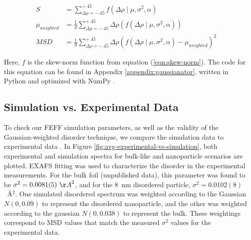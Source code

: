 
\begin{align}
	\label{eqn:updated-weighted-MSD}
	S &= \sum_{\Delta\rho=-.45}^{+.45} f\left(\Delta \rho \mid \mu, \sigma^2, \alpha \right) \\
	\mu_{weighted} &= \frac{1}{S} \sum_{\Delta\rho=-.45}^{+.45} \Delta\rho \left( f ( \Delta \rho \mid \mu, \sigma^2, \alpha ) \right) \\
	MSD &= \frac{1}{S} \sum_{\Delta\rho=-.45}^{+.45} \Delta \rho \left( f ( \Delta \rho \mid \mu, \sigma^2, \alpha ) - \mu_{weighted} \right) ^2
\end{align}

\noindent Here, $ f $ is the skew-norm function from equation (\ref{eqn:skew-norm}). The code for this equation can be found in Appendix \ref{appendix:gaussianator}, written in Python and optimized with NumPy \cite{numpy}.

\subsection{Simulation vs. Experimental Data} \label{sec:end-disorder}

To check our FEFF simulation parameters, as well as the validity of the Gaussian-weighted disorder technique, we compare the simulation data to experimental data \cite{au-nanowires-silca-wang} \cite{crooks-55nm-au-exp} \cite{jing-au-nanoparticle-exp}. In Figure \ref{fig:avg-experimental-vs-simulation}, both experimental and simulation spectra for bulk-like and nanoparticle scenarios are plotted. EXAFS fitting was used to characterize the disorder in the experimental measurements. For the bulk foil (unpublished data), this parameter was found to be $ \sigma^2=0.0081(5)~{\AA}^2 $, and for the 8~nm disordered particle, $ \sigma^2=0.0102(8) $~{\AA}$ ^2 $.  One simulated disordered spectrum was weighted according to the Gaussian $ N(0, 0.09) $ to represent the disordered nanoparticle, and the other was weighted according to the gaussian $ N(0, 0.038)  $ to represent the bulk. These weightings correspond to MSD values that match the measured $ \sigma^2 $ values for the experimental data.  

